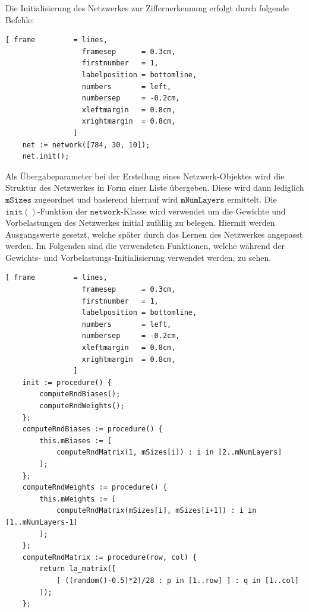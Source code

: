 \noindent
Die Initialisierung des Netzwerkes zur Ziffernerkennung erfolgt durch folgende Befehle:
\begin{Verbatim}[ frame         = lines, 
                  framesep      = 0.3cm, 
                  firstnumber   = 1,
                  labelposition = bottomline,
                  numbers       = left,
                  numbersep     = -0.2cm,
                  xleftmargin   = 0.8cm,
                  xrightmargin  = 0.8cm,
                ]
    net := network([784, 30, 10]);
    net.init();
\end{Verbatim}
Als Übergabeparameter bei der Erstellung eines Netzwerk-Objektes wird die Struktur des Netzwerkes in Form einer Liste übergeben. Diese wird dann lediglich $\mathtt{mSizes}$ zugeordnet und basierend hierrauf wird $\mathtt{mNumLayers}$ ermittelt.
Die $\mathtt{init()}$-Funktion der $\mathtt{network}$-Klasse wird verwendet um die Gewichte und Vorbelastungen des Netzwerkes initial zufällig zu belegen. Hiermit werden Ausgangswerte gesetzt, welche später durch das Lernen des Netzwerkes angepasst werden.
Im Folgenden sind die verwendeten Funktionen, welche während der Gewichts- und Vorbelastungs-Initialisierung verwendet werden, zu sehen.
\begin{Verbatim}[ frame         = lines, 
                  framesep      = 0.3cm, 
                  firstnumber   = 1,
                  labelposition = bottomline,
                  numbers       = left,
                  numbersep     = -0.2cm,
                  xleftmargin   = 0.8cm,
                  xrightmargin  = 0.8cm,
                ]
    init := procedure() {
        computeRndBiases();
        computeRndWeights();
    };
    computeRndBiases := procedure() {
        this.mBiases := [ 
            computeRndMatrix(1, mSizes[i]) : i in [2..mNumLayers] 
        ];
    };
    computeRndWeights := procedure() {
        this.mWeights := [ 
            computeRndMatrix(mSizes[i], mSizes[i+1]) : i in [1..mNumLayers-1] 
        ];
    };
    computeRndMatrix := procedure(row, col) {
        return la_matrix([
            [ ((random()-0.5)*2)/28 : p in [1..row] ] : q in [1..col]
        ]);
    };
\end{Verbatim}

